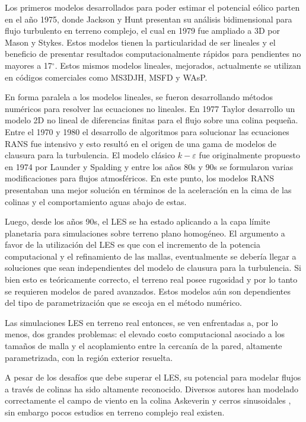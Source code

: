 Los primeros modelos desarrollados para poder estimar el potencial eólico parten en el año 1975, donde Jackson y Hunt presentan su análisis bidimensional para flujo turbulento en terreno complejo, el cual en 1979 fue ampliado a 3D por Mason y Stykes. Estos modelos tienen la particularidad de ser lineales y el beneficio de presentar resultados computacionalmente rápidos para pendientes no mayores a 17$^\circ$. Estos mismos modelos lineales, mejorados, actualmente se utilizan en códigos comerciales como MS3DJH, MSFD y WAsP.

En forma paralela a los modelos lineales, se fueron desarrollando métodos numéricos para resolver las ecuaciones no lineales. En 1977 Taylor desarrollo un modelo 2D no lineal de diferencias finitas para el flujo sobre una colina pequeña. Entre el 1970 y 1980 el desarrollo de algoritmos para solucionar las ecuaciones RANS fue intensivo y esto resultó en el origen de una gama de modelos de clausura para la turbulencia. El modelo clásico $k-\varepsilon$ fue originalmente propuesto en 1974 por Launder y Spalding y entre los años 80s y 90s se formularon varias modificaciones para flujos atmosféricos. En este punto, los modelos RANS presentaban una mejor solución en términos de la aceleración en la cima de las colinas y el comportamiento aguas abajo de estas.

Luego, desde los años 90s, el LES se ha estado aplicando a la capa límite planetaria para simulaciones sobre terreno plano homogéneo. El argumento a favor de la utilización del LES es que con el incremento de la potencia computacional y el refinamiento de las mallas, eventualmente se debería llegar a soluciones que sean independientes del modelo de clausura para la turbulencia. Si bien esto es teóricamente correcto, el terreno real posee rugosidad y por lo tanto se requieren modelos de pared avanzados. Estos modelos aún son dependientes del tipo de parametrización que se escoja en el método numérico.

Las simulaciones LES en terreno real entonces, se ven enfrentadas a, por lo menos, dos grandes problemas: el elevado costo computacional asociado a los tamaños de malla y el acoplamiento entre la cercanía de la pared, altamente parametrizada, con la región exterior resuelta.

A pesar de los desafíos que debe superar el LES, su potencial para modelar flujos a través de colinas ha sido altamente reconocido. Diversos autores han modelado correctamente el campo de viento en la colina Askeverin \citep{Chow2009,doi:10.1002/we.414} y cerros sinusoidales \citep{brown2001large,wan2007evaluation}, sin embargo pocos estudios en terreno complejo real existen.
